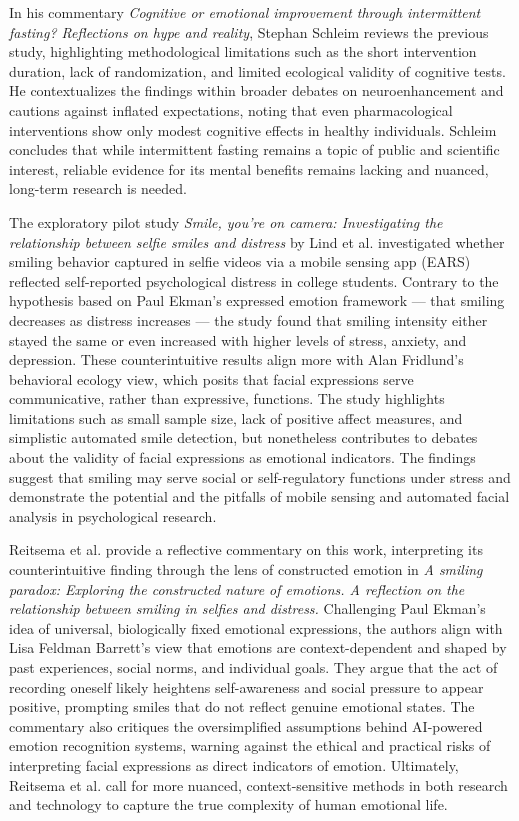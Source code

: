 \documentclass[authordate, empirical]{jote-new-article}
\begin{document}
	In his commentary \emph{Cognitive or emotional improvement through intermittent fasting? Reflections on hype and reality}, Stephan Schleim reviews the previous study, highlighting methodological limitations such as the short intervention duration, lack of randomization, and limited ecological validity of cognitive tests. He contextualizes the findings within broader debates on neuroenhancement and cautions against inflated expectations, noting that even pharmacological interventions show only modest cognitive effects in healthy individuals. Schleim concludes that while intermittent fasting remains a topic of public and scientific interest, reliable evidence for its mental benefits remains lacking and nuanced, long-term research is needed.



	The exploratory pilot study \emph{Smile, you're on camera: Investigating the relationship between selfie smiles and distress} by Lind et al. investigated whether smiling behavior captured in selfie videos via a mobile sensing app (EARS) reflected self-reported psychological distress in college students. Contrary to the hypothesis based on Paul Ekman's expressed emotion framework — that smiling decreases as distress increases — the study found that smiling intensity either stayed the same or even increased with higher levels of stress, anxiety, and depression. These counterintuitive results align more with Alan Fridlund's behavioral ecology view, which posits that facial expressions serve communicative, rather than expressive, functions. The study highlights limitations such as small sample size, lack of positive affect measures, and simplistic automated smile detection, but nonetheless contributes to debates about the validity of facial expressions as emotional indicators. The findings suggest that smiling may serve social or self-regulatory functions under stress and demonstrate the potential and the pitfalls of mobile sensing and automated facial analysis in psychological research.



	Reitsema et al. provide a reflective commentary on this work, interpreting its counterintuitive finding through the lens of constructed emotion in \emph{A smiling paradox: Exploring the constructed nature of emotions. A reflection on the relationship between smiling in selfies and distress.} Challenging Paul Ekman's idea of universal, biologically fixed emotional expressions, the authors align with Lisa Feldman Barrett's view that emotions are context-dependent and shaped by past experiences, social norms, and individual goals. They argue that the act of recording oneself likely heightens self-awareness and social pressure to appear positive, prompting smiles that do not reflect genuine emotional states. The commentary also critiques the oversimplified assumptions behind AI-powered emotion recognition systems, warning against the ethical and practical risks of interpreting facial expressions as direct indicators of emotion. Ultimately, Reitsema et al. call for more nuanced, context-sensitive methods in both research and technology to capture the true complexity of human emotional life.
\end{document}
